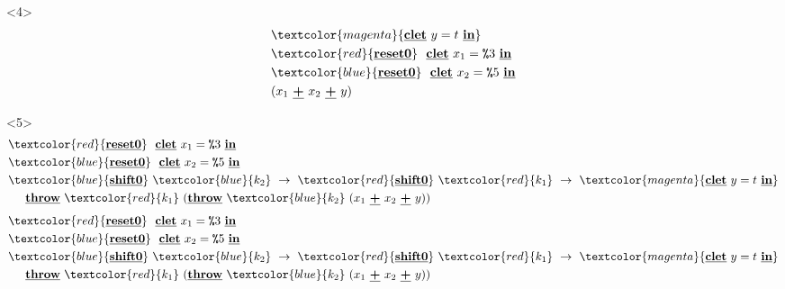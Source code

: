 \documentclass[dvipdfmx,cjk,xcolor=dvipsnames,envcountsect,notheorems,12pt]{beamer}
\newcommand\cResetz{\underline{\textbf{reset0}}}
\newcommand\cShiftz{\underline{\textbf{shift0}}}
\newcommand\cThrow{\underline{\textbf{throw}}}
\newcommand\cPlus{\underline{\textbf{+}}}
\newcommand\cLet{\underline{\textbf{clet}}}
\newcommand\cIn{\underline{\textbf{in}}}
\newcommand\csp[1]{\texttt{\%}{#1}}
\newcommand\red[1]{\textcolor{red}{#1}}
\newcommand\magenta[1]{\textcolor{magenta}{#1}}
\newcommand\blue[1]{\textcolor{blue}{#1}}
\theoremstyle{definition}
\begin{document}
\begin{frame}
  \begin{onlyenv}<4>
    \begin{align*}
      & \magenta{\cLet~y=t~\cIn} \\
      & \red{\cResetz} ~~\cLet~x_1=\csp{3}~\cIn \\
      & \blue{\cResetz} ~~\cLet~x_2=\csp{5}~\cIn \\
      & (x_1~\cPlus~x_2~\cPlus~y)
    \end{align*}
  \end{onlyenv}

  \begin{onlyenv}<5>
    \begin{align*}
      & \red{\cResetz} ~~\cLet~x_1=\csp{3}~\cIn \\
      & \blue{\cResetz} ~~\cLet~x_2=\csp{5}~\cIn \\
      & \blue{\cShiftz}~\blue{k_2}~\to~ \red{\cShiftz}~\red{k_1}~\to~ \magenta{\cLet~y=t~\cIn} \\
      & \phantom{=}~~ \cThrow~\red{k_1}~(\cThrow~\blue{k_2}~(x_1~\cPlus~x_2~\cPlus~y))
    \end{align*}
    \begin{align*}
      & \red{\cResetz} ~~\cLet~x_1=\csp{3}~\cIn \\
      & \blue{\cResetz} ~~\cLet~x_2=\csp{5}~\cIn \\
      & \blue{\cShiftz}~\blue{k_2}~\to~ \red{\cShiftz}~\red{k_1}~\to~ \magenta{\cLet~y=t~\cIn} \\
      & \phantom{=}~~ \cThrow~\red{k_1}~(\cThrow~\blue{k_2}~(x_1~\cPlus~x_2~\cPlus~y))
    \end{align*}
  \end{onlyenv}
\end{frame}
\end{document}
